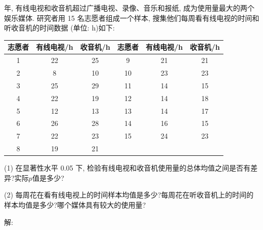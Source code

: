 \documentclass[standard]{ExBook}
\begin{document}
\begin{qitems}
    \begin{bbox}
    \begin{shaded}
         年, 有线电视和收音机超过广播电视、录像、音乐和报纸, 成为使用量最大的两个娱乐媒体. 研究者用 15 名志愿者组成一个样本, 搜集他们每周看有线电视的时间和听收音机的时间数据 (单位: h)如下:
\begin{center}
\setlength{\tabcolsep}{17pt}
\begin{tabular}{ccc||ccc}
\hline
志愿者 & 有线电视/h & 收音机/h & 志愿者 & 有线电视/h & 收音机/h\\
\hline
1 & 22 & 25 & 9 & 21 & 21 \\
2 & 8 & 10 & 10 & 23 & 23 \\
3 & 25 & 29 & 11 & 14 & 15 \\
4 & 22 & 19 & 12 & 14 & 18 \\
5 & 12 & 13 & 13 & 14 & 17 \\
6 & 26 & 28 & 14 & 16 & 15 \\
7 & 22 & 23 & 15 & 24 & 23 \\
8 & 19 & 21 &  &  &  \\
\hline
\end{tabular}
\end{center}
(1) 在显著性水平 0.05 下, 检验有线电视和收音机使用量的总体均值之间是否有差异?实际$p$值是多少?

(2) 每周花在看有线电视上的时间样本均值是多少?每周花在听收音机上的时间的样本均值是多少?哪个媒体具有较大的使用量?
    \end{shaded}
    \end{bbox}

\vspace{-5em}

    \begin{bbox}
解: 
    \end{bbox}

\vspace{-5em}


\end{qitems}
\end{document}
